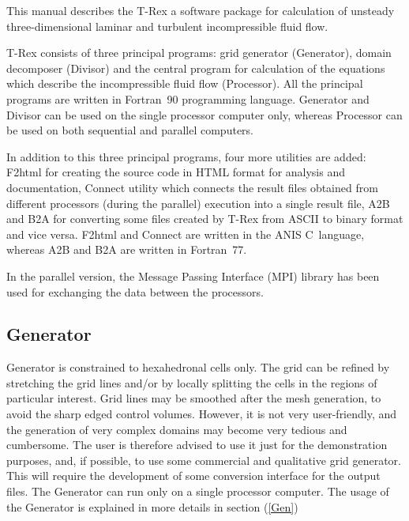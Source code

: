 \documentclass[10pt]{article}
\newcommand*{\tn}{\sffamily} %
\begin{document}
    This manual describes the {\tn T-Rex} a software package 
    for calculation of unsteady three-dimensional laminar and 
    turbulent incompressible fluid flow. 
    
    {\tn T-Rex} consists of three principal programs: grid
    generator ({\tn Generator}), domain decomposer ({\tn Divisor})
    and the central program for calculation of the equations which
    describe the incompressible fluid flow
    ({\tn Processor}). All the principal programs are written in 
    Fortran~90
    programming language. {\tn Generator} and {\tn Divisor} can
    be used on the single processor computer only, whereas 
    {\tn Processor} can be used on both sequential and parallel
    computers. 

    In addition to this three principal programs, four 
    more utilities are added: {\tn F2html} for creating the 
    source code in HTML format for analysis and documentation,
    {\tn Connect} utility which connects the result files
    obtained from different processors (during the 
    parallel) execution into a single result
    file, {\tn A2B} and {\tn B2A} for converting some files
    created by {\tn T-Rex} from ASCII to binary format and
    vice versa. 
    {\tn F2html} and {\tn Connect} are written in the
    ANIS C~language, whereas {\tn A2B} and {\tn B2A} are
    written in Fortran~77.

    In the parallel version, the Message Passing
    Interface (MPI) library has been used for exchanging the 
    data between the processors.   

    \subsection{{\tn Generator}}
 
    {\tn Generator} is constrained to hexahedronal cells only.
    The grid can be refined by stretching the grid lines  
    and/or by locally splitting the cells in the regions of
    particular interest. Grid lines may be smoothed after the
    mesh generation, to avoid the sharp edged control volumes.
    However, it is not very user-friendly, and the generation
    of very complex domains may become very tedious and 
    cumbersome. The user is therefore advised to use it
    just for the demonstration purposes, and, if possible,
    to use some commercial and qualitative grid generator.
    This will require the development of some conversion 
    interface for the output files. The {\tn Generator} can 
    run only on a single processor computer.  The usage of the 
    {\tn Generator} is explained in more details in section
    (\ref{Gen})
    
\end{document}
